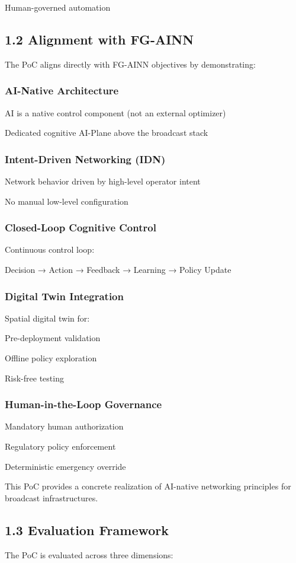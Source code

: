 \documentclass{article}
\begin{document}
Human-governed automation

\subsection{1.2 Alignment with FG-AINN}
The PoC aligns directly with FG-AINN objectives by demonstrating:

\subsubsection{AI-Native Architecture}
AI is a native control component (not an external optimizer)

Dedicated cognitive AI-Plane above the broadcast stack

\subsubsection{Intent-Driven Networking (IDN)}
Network behavior driven by high-level operator intent

No manual low-level configuration

\subsubsection{Closed-Loop Cognitive Control}
Continuous control loop:

Decision → Action → Feedback → Learning → Policy Update

\subsubsection{Digital Twin Integration}
Spatial digital twin for:

Pre-deployment validation

Offline policy exploration

Risk-free testing

\subsubsection{Human-in-the-Loop Governance}
Mandatory human authorization

Regulatory policy enforcement

Deterministic emergency override

This PoC provides a concrete realization of AI-native networking principles for broadcast infrastructures.

\subsection{1.3 Evaluation Framework}
The PoC is evaluated across three dimensions:
\end{document}
